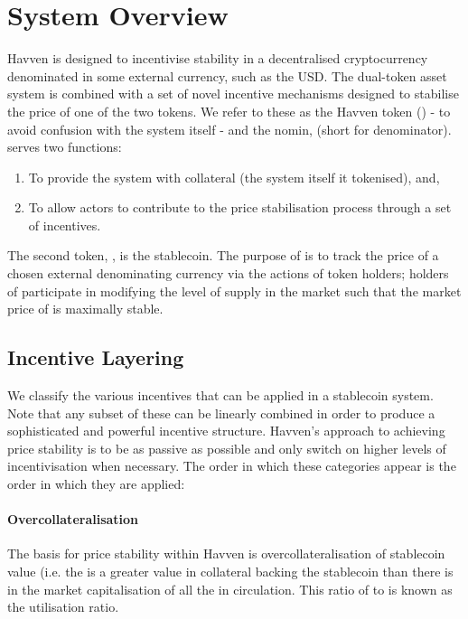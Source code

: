 \section{System Overview} Havven is designed to incentivise stability in a decentralised cryptocurrency denominated in some external currency, such as the USD. The dual-token asset system is combined with a set of novel incentive mechanisms designed to stabilise the price of one of the two tokens. We refer to these as the Havven token (\HAV{}) - to avoid confusion with the system itself - and the nomin, \NOM{} (short for denominator). \\

\noindent \HAV{} serves two functions:

\begin{enumerate}
\item{To provide the system with collateral (the system itself it tokenised), and,}
\item{To allow actors to contribute to the price stabilisation process through a set of incentives.}
\end{enumerate}

\noindent The second token, \NOM{}, is the stablecoin. The purpose of \NOM{} is to track the price of a chosen external denominating currency via the actions of \HAV{} token holders; holders of \HAV{} participate in modifying the level of supply in the \NOM{} market such that the market price of \NOM{} is maximally stable.

\subsection{Incentive Layering}

We classify the various incentives that can be applied in a stablecoin system. Note that any subset of these can be linearly combined in order to produce a sophisticated and powerful incentive structure. Havven's approach to achieving price stability is to be as passive as possible and only switch on higher levels of incentivisation when necessary. The order in which these categories appear is the order in which they are applied:

\paragraph{Overcollateralisation}

The basis for price stability within Havven is overcollateralisation of stablecoin value (i.e. the is a greater value in collateral backing the stablecoin than there is in the market capitalisation of all the \NOM{} in circulation. This ratio of \NOM{} to \HAV{} is known as the utilisation ratio.

